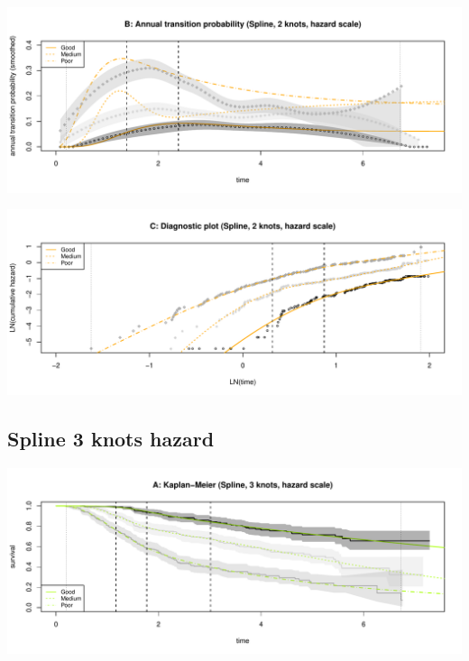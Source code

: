 \documentclass[
]{article}
\begin{document}
\begin{flushleft}\includegraphics[height=0.25\textheight]{Images/spline_hazard2-2} \end{flushleft}

\begin{flushleft}\includegraphics[height=0.25\textheight]{Images/spline_hazard2-3} \end{flushleft}

\clearpage

\hypertarget{spline-3-knots-hazard}{%
\subsection{Spline 3 knots hazard}\label{spline-3-knots-hazard}}

\begin{flushleft}\includegraphics[height=0.25\textheight]{Images/spline_hazard3-1} \end{flushleft}
\end{document}
